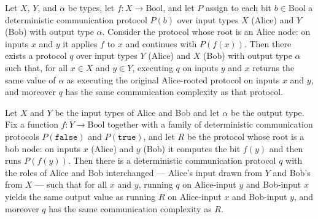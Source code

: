 \begin{theorem}
\label{CommunicationComplexity.Deterministic.Protocol.alice_to_bob}
\leanok
{}
Let $X$, $Y$, and $\alpha$ be types, let $f : X \to \mathrm{Bool}$, and let $P$ assign
to each bit $b \in \mathrm{Bool}$ a deterministic communication protocol $P(b)$ over
input types $X$ (Alice) and $Y$ (Bob) with output type $\alpha$. Consider the protocol
whose root is an Alice node: on inputs $x$ and $y$ it applies $f$ to $x$ and continues
with $P(f(x))$. Then there exists a protocol $q$ over input types $Y$ (Alice) and $X$
(Bob) with output type $\alpha$ such that, for all $x \in X$ and $y \in Y$, executing
$q$ on inputs $y$ and $x$ returns the same value of $\alpha$ as executing the original
Alice-rooted protocol on inputs $x$ and $y$, and moreover $q$ has the same communication
complexity as that protocol.
\end{theorem}

\begin{theorem}
\label{CommunicationComplexity.Deterministic.Protocol.bob_to_alice}
\leanok
{}
Let $X$ and $Y$ be the input types of Alice and Bob and let $\alpha$ be the output type.
Fix a function $f : Y \to \mathrm{Bool}$ together with a family of deterministic
communication protocols $P(\mathtt{false})$ and $P(\mathtt{true})$, and let $R$ be the
protocol whose root is a bob node: on inputs $x$ (Alice) and $y$ (Bob) it computes the
bit $f(y)$ and then runs $P(f(y))$. Then there is a deterministic communication protocol
$q$ with the roles of Alice and Bob interchanged — Alice's input drawn from $Y$ and
Bob's from $X$ — such that for all $x$ and $y$, running $q$ on Alice-input $y$ and
Bob-input $x$ yields the same output value as running $R$ on Alice-input $x$ and
Bob-input $y$, and moreover $q$ has the same communication complexity as $R$.
\end{theorem}

